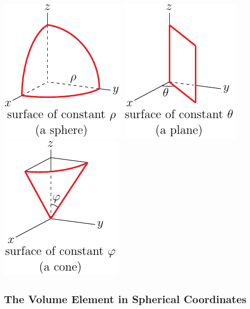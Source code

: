 \begin{wfig}
\begin{center}
    \includegraphics{spher2.pdf}\qquad
    \includegraphics{spher3.pdf}\qquad
    \includegraphics{spher4.pdf}
\end{center}
\end{wfig}


\subsection{The Volume Element in Spherical Coordinates} \label{sec spherical vol}

